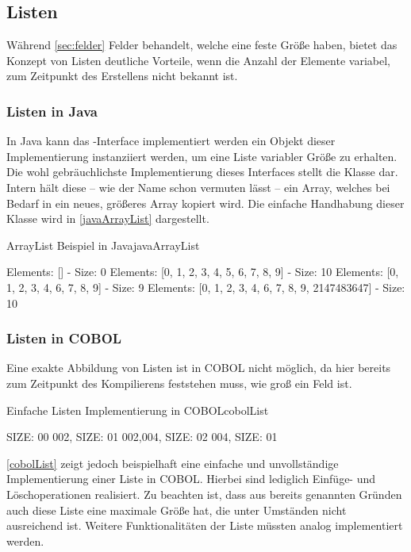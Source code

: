 \subsection{Listen}\label{lists}
Während \autoref{sec:felder} Felder behandelt, welche eine feste Größe haben, bietet das Konzept von Listen deutliche Vorteile, wenn die Anzahl der Elemente variabel, \dahe zum Zeitpunkt des Erstellens nicht bekannt ist.

\subsubsection*{Listen in Java}

In Java kann das -Interface implementiert werden \bzw ein Objekt dieser Implementierung instanziiert werden, um eine Liste variabler Größe zu erhalten. Die wohl gebräuchlichste Implementierung dieses Interfaces stellt die Klasse  dar. Intern hält diese -- wie der Name schon vermuten lässt -- ein Array, welches bei Bedarf in ein neues, größeres Array kopiert wird. Die einfache Handhabung dieser Klasse wird in  \autoref{javaArrayList} dargestellt.

\clearpage

\begin{codeWithCaption}{ArrayList Beispiel in Java}{javaArrayList}
     \cFollow
    \begin{shellwindow}
    Elements: [] - Size: 0
    Elements: [0, 1, 2, 3, 4, 5, 6, 7, 8, 9] - Size: 10
    Elements: [0, 1, 2, 3, 4, 6, 7, 8, 9] - Size: 9
    Elements: [0, 1, 2, 3, 4, 6, 7, 8, 9, 2147483647] - Size: 10
    \end{shellwindow}
\end{codeWithCaption}

\subsubsection*{Listen in COBOL}
Eine exakte Abbildung von Listen ist in COBOL nicht möglich, da hier bereits zum Zeitpunkt des Kompilierens feststehen muss, wie groß ein Feld ist.

\begin{codeWithCaption}{Einfache Listen Implementierung in COBOL}{cobolList}
     \cFollow
    \begin{shellwindow}
     SIZE: 00
    002, SIZE: 01
    002,004, SIZE: 02
    004, SIZE: 01
    \end{shellwindow}
\end{codeWithCaption}

\autoref{cobolList} zeigt jedoch beispielhaft eine einfache und unvollständige Implementierung einer Liste in COBOL. Hierbei sind lediglich Einfüge- und Löschoperationen realisiert. Zu beachten ist, dass aus bereits genannten Gründen auch diese Liste eine maximale Größe hat, die unter Umständen nicht ausreichend ist. Weitere Funktionalitäten der Liste müssten analog implementiert werden.